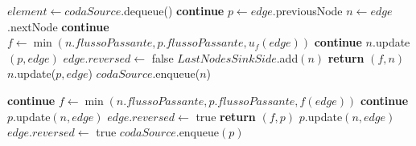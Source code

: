 \documentclass{article}
\begin{document}
\begin{algorithm}
    \begin{algorithmic}[1]
        \STATE$ element \leftarrow codaSource$.dequeue()
        \STATE \textbf{continue}
        \ENDIF
        \STATE $p \leftarrow edge$.previousNode
        \STATE $n \leftarrow edge$.nextNode
         
        \STATE \textbf{continue}
        \ELSE
        \STATE $f \leftarrow \min(n.flussoPassante,p.flussoPassante,u_f(edge))$
        \STATE \textbf{continue}
        \ENDIF
        \STATE $n.$update$(p,edge)$
        \STATE $edge.reversed \leftarrow $ false
        \STATE $LastNodesSinkSide.$add$(n)$
        \STATE \textbf{return} $(f,n)$
        \ENDIF
        \ENDIF
        \STATE $n.$update($p,edge$)
        \STATE $codaSource$.enqueue($n$)
    \end{algorithmic}
\end{algorithm}
\newpage
\begin{algorithm}
    \begin{algorithmic}
        \STATE\textbf{continue}
        \ELSE
        \STATE $f \leftarrow \min (n.flussoPassante,p.flussoPassante,f(edge))$
        \STATE \textbf{continue}
        \ENDIF
        \STATE $p.$update$(n,edge)$
        \STATE $edge.reversed \leftarrow$ true
        \STATE \textbf{return } $(f,p)$
        \ENDIF
        \ENDIF
        \STATE $p$.update$(n,edge)$
        \STATE $edge.reversed \leftarrow$ true
        \STATE $codaSource.$enqueue$(p)$
        \ENDIF
        \ENDFOR
        \ENDIF
    \end{algorithmic}
\end{algorithm}
\newpage
\end{document}
